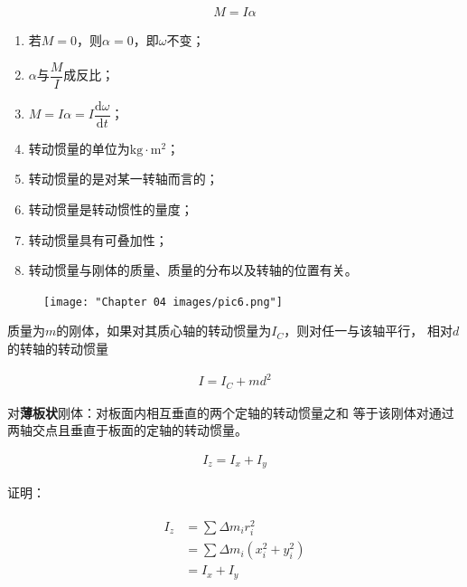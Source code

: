 \documentclass[
	12pt, %
	a4paper, %
]{myLegrandOrangeBook}
\newcommand{\rmd}{\mathrm{d}}
\newcommand{\dderiv}[2]{\dfrac{\rmd #1}{\rmd #2}}
\begin{document}
\begin{theorem}[转动定律]
    \begin{align}
        M = I \alpha
    \end{align}
\end{theorem}

    \begin{enumerate}
        \item 若\(M=0\)，则\(\alpha=0\)，即\(\omega\)不变；
        \item \(\alpha \)与\(\dfrac{M}{I}\)成反比；
        \item \(M = I\alpha = I\dderiv{\omega}{t}\)；
        \item 转动惯量的单位为\(\mathrm{kg} \cdot \mathrm{m^2}\)；
        \item 转动惯量的是对某一转轴而言的；
        \item 转动惯量是转动惯性的量度；
        \item 转动惯量具有可叠加性；
        \item 转动惯量与刚体的质量、质量的分布以及转轴的位置有关。
    \end{enumerate}

    \begin{figure}
        \centering
        \texttt{[image: "Chapter 04 images/pic6.png"]}
        \label{pic4-6}
    \end{figure}

\begin{theorem}[平行轴定理]
    质量为\(m\)的刚体，如果对其质心轴的转动惯量为\(I_{C}\)，则对任一与该轴平行，
    相对\(d\)的转轴的转动惯量

    \begin{align}
        I = I_{C} + md^2
    \end{align}
\end{theorem}

\begin{theorem}

    对\textbf{薄板状}刚体：对板面内相互垂直的两个定轴的转动惯量之和
    等于该刚体对通过两轴交点且垂直于板面的定轴的转动惯量。

    \begin{align}
        I_{z} = I_{x} + I_{y}
    \end{align}
\end{theorem}

    证明：

    \begin{align*}
        \begin{aligned}
            I_{z} &= \sum \Delta m_{i}r_{i}^2 \\
            &= \sum \Delta m_{i}\left(x_{i}^2 + y_{i}^2\right) \\
            &= I_{x} + I_{y}
        \end{aligned}
    \end{align*}
\end{document}
